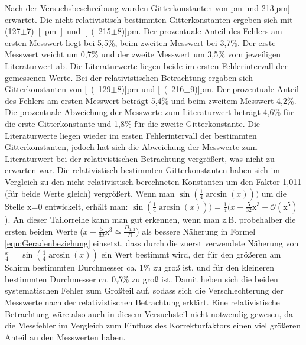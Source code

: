 \documentclass[12pt,a4paper]{article}
\begin{document}
Nach der Versuchsbeschreibung wurden Gitterkonstanten von \unit[123]{pm} und \unit{213}[pm] erwartet. Die nicht relativistisch bestimmten Gitterkonstanten ergeben sich mit \unit{(127$\pm$7)}[pm] und \unit[(215$\pm$8)]{pm}. Der prozentuale Anteil des Fehlers am ersten Messwert liegt bei 5,5\%, beim zweiten Messwert bei 3,7\%. Der erste Messwert weicht um 0,7\% und der zweite Messwert um 3,5\% vom jeweiligen Literaturwert ab. Die Literaturwerte liegen beide im ersten Fehlerintervall der gemessenen Werte.
Bei der relativistischen Betrachtung ergaben sich Gitterkonstanten von \unit[(129$\pm$8)]{pm} und \unit[(216$\pm$9)]{pm}. Der prozentuale Anteil des Fehlers am ersten Messwert beträgt 5,4\% und beim zweitem Messwert 4,2\%. Die prozentuale Abweichung der Messwerte zum Literaturwert beträgt 4,6\% für die erste Gitterkonstante und 1,8\% für die zweite Gitterkonstante. Die Literaturwerte liegen wieder im ersten Fehlerintervall der bestimmten Gitterkonstanten,
jedoch hat sich die Abweichung der Messwerte zum Literaturwert bei der relativistischen Betrachtung vergrößert, was nicht zu erwarten war. Die relativistisch bestimmten Gitterkonstanten haben sich im Vergleich zu den nicht relativistisch berechneten Konstanten um den Faktor 1,011  (für beide Werte gleich) vergrößert. Wenn man $\sin(\frac{1}{4}\arcsin(x)))$ um die Stelle x=0 entwickelt, erhält man: $\sin(\frac{1}{4}\arcsin(x)))=\frac{1}{4}(x+\frac{5}{32} \text{x}^3 + \mathcal{O}(\text{x}^5) $). An dieser Tailorreihe kann man gut erkennen, wenn man z.B. probehalber die ersten beiden Werte ($x+\frac{5}{32} \text{x}^3\simeq\frac{D_{1,2}}{D}$) als bessere Näherung in Formel \ref{eqn:Geradenbeziehung} einsetzt, dass durch die zuerst verwendete Näherung von $\frac{x}{4}=\sin(\frac{1}{4}\arcsin(x))$ ein Wert bestimmt wird, der für den größeren am Schirm bestimmten Durchmesser ca. 1\% zu groß ist, und für den kleineren bestimmten Durchmesser ca. 0,5\% zu groß ist. Damit heben sich die beiden systematischen Fehler zum Großteil auf, sodass sich die Verschlechterung der Messwerte nach der relativistischen Betrachtung erklärt. Eine relativistische Betrachtung wäre also auch in diesem Versuchsteil nicht notwendig gewesen, da die Messfehler im Vergleich zum Einfluss des Korrekturfaktors einen viel größeren Anteil an den Messwerten haben.
\end{document}
